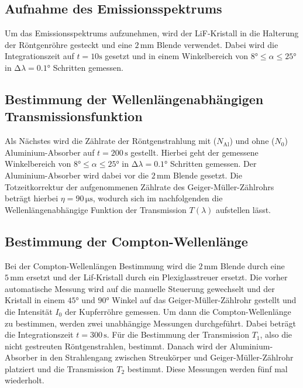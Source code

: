 \subsection{Aufnahme des Emissionsspektrums}

\begin{flushleft}
    Um das Emissionsspektrums aufzunehmen, wird der LiF-Kristall in die Halterung der Röntgenröhre gesteckt und eine $2\,\unit{\milli\meter}$ Blende verwendet.
    Dabei wird die Integrationszeit auf $t=10\unit{\second}$ gesetzt und in einem Winkelbereich von $8\unit{\degree} \leq \alpha \leq 25\unit{\degree} $ in $\increment \lambda = 0.1\unit{\degree}$ Schritten gemessen. 
\end{flushleft}

\subsection{Bestimmung der Wellenlängenabhängigen Transmissionsfunktion}

\begin{flushleft}
    Als Nächstes wird die Zählrate der Röntgenstrahlung mit ($N_{\text{Al}}$) und ohne ($N_{0}$) Aluminium-Absorber auf $t = 200\,\unit{\second}$ gestellt.
    Hierbei geht der gemessene Winkelbereich von $8\unit{\degree} \leq \alpha \leq 25\unit{\degree} $ in $\increment \lambda = 0.1\unit{\degree}$ Schritten gemessen.
    Der Aluminium-Absorber wird dabei vor die $2\,\unit{\milli\meter}$ Blende gesetzt.
    Die Totzeitkorrektur der aufgenommenen Zählrate des Geiger-Müller-Zählrohrs beträgt hierbei $\eta = 90\,\unit{\micro\second}$, wodurch sich im nachfolgenden die Wellenlängenabhängige Funktion der Transmission $T(\lambda)$ aufstellen lässt.    
\end{flushleft}

\subsection{Bestimmung der Compton-Wellenlänge}

\begin{flushleft}
    Bei der Compton-Wellenlängen Bestimmung wird die $2\,\unit{\milli\meter}$ Blende durch eine $5\,\unit{\milli\meter}$ ersetzt und der Lif-Kristall durch ein Plexiglasstreuer ersetzt.
    Die vorher automatische Messung wird auf die manuelle Steuerung gewechselt und der Kristall in einem $45\unit{\degree}$ und $90\unit{\degree}$ Winkel auf das Geiger-Müller-Zählrohr gestellt und die Intensität $I_{0}$ der Kupferröhre gemessen.
    Um dann die Compton-Wellenlänge zu bestimmen, werden zwei unabhängige Messungen durchgeführt.
    Dabei beträgt die Integrationszeit $t=300\,\unit{\second}$. Für die Bestimmung der Transmission $T_{1}$, also die nicht gestreuten Röntgenstrahlen, bestimmt. 
    Danach wird der Aluminium-Absorber in den Strahlengang zwischen Streukörper und Geiger-Müller-Zählrohr platziert und die Transmission $T_{2}$ bestimmt.
    Diese Messungen werden fünf mal wiederholt.
\end{flushleft}
